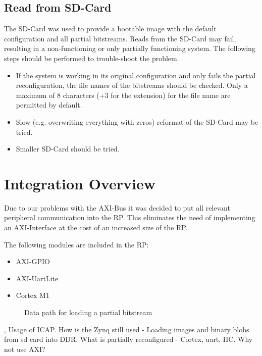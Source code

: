 \subsection{Read from SD-Card}
The SD-Card was used to provide a bootable image with the default configuration and all partial bitstreams.
Reads from the SD-Card may fail, resulting in a non-functioning or only partially functioning system.
The following steps should be performed to trouble-shoot the problem. 
\begin{itemize}
    \item If the system is working in its original configuration and only fails the partial reconfiguration, the file names of the bitstreams should be checked. Only a maximum of 8 characters (+3 for the extension) for the file name are permitted by default. 
    \item Slow (e.g. overwriting everything with zeros) reformat of the SD-Card may be tried.
    \item Smaller SD-Card should be tried.
\end{itemize}
\section{Integration Overview}
Due to our problems with the AXI-Bus it was decided to put all relevant peripheral communication into the \gls{RP}.
This eliminates the need of implementing an AXI-Interface at the cost of an increased size of the \gls{RP}.

The following modules are included in the \gls{RP}:
\begin{itemize}
    \item  AXI-GPIO
    \item  AXI-UartLite
    \item  Cortex M1
\end{itemize}

\begin{figure}[ht]
    \centering
{}
\caption{Data path for loading a partial bitstream}\label{fig:prIntegration}
\end{figure}
\cite{xilinx_vivado_2018-1}, \cite{xilinx_vivado_2018}
Usage of \gls{ICAP}.
How is the Zynq still used - Loading images and binary blobs from sd card into DDR.
What is partially reconfigured - Cortex, uart, IIC.
Why not use AXI?
